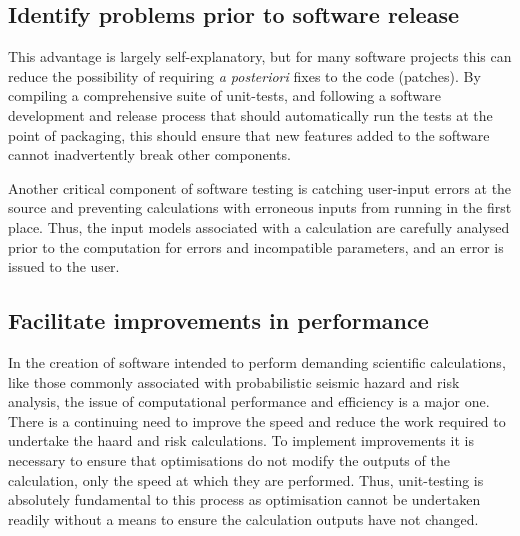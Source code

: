 \subsection{Identify problems prior to software release}
This advantage is largely self-explanatory, but for many software projects this can reduce the possibility of requiring \emph{a posteriori} fixes to the code (patches). By compiling a comprehensive suite of unit-tests, and following a software development and release process that should automatically run the tests at the point of packaging, this should ensure that new features added to the software cannot inadvertently break other components.

Another critical component of software testing is catching user-input errors at the source and preventing calculations with erroneous inputs from running in the first place. Thus, the input models associated with a calculation are carefully analysed prior to the computation for errors and incompatible parameters, and an error is issued to the user.

\subsection{Facilitate improvements in performance}
In the creation of software intended to perform demanding scientific calculations, like those commonly associated with probabilistic seismic hazard and risk analysis, the issue of computational performance and efficiency is a major one. There is a continuing need to improve the speed and reduce the work required to undertake the haard and risk calculations. To implement improvements it is necessary to ensure that optimisations do not modify the outputs of the calculation, only the speed at which they are performed. Thus, unit-testing is absolutely fundamental to this process as optimisation cannot be undertaken readily without a means to ensure the calculation outputs have not changed.